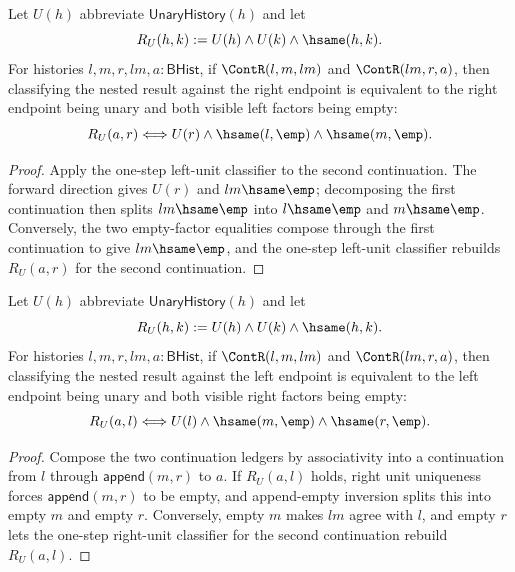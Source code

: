 \begin{theorem}
\label{thm:concrete-unary-history-magma-cont-nested-left-unit-classifier}
Let $U(h)$ abbreviate $\mathsf{UnaryHistory}(h)$ and let
$$
R_U(h,k):=U(h)\land U(k)\land\hsame(h,k).
$$
For histories $l,m,r,lm,a:\mathsf{BHist}$, if
$\ContR(l,m,lm)$ and $\ContR(lm,r,a)$, then classifying the nested result
against the right endpoint is equivalent to the right endpoint being unary and
both visible left factors being empty:
$$
R_U(a,r)
\Longleftrightarrow
U(r)\land\hsame(l,\emp)\land\hsame(m,\emp).
$$
\end{theorem}
\begin{proof}
Apply the one-step left-unit classifier to the second continuation. The
forward direction gives $U(r)$ and $lm\hsame\emp$; decomposing the first
continuation then splits $lm\hsame\emp$ into $l\hsame\emp$ and
$m\hsame\emp$. Conversely, the two empty-factor equalities compose through
the first continuation to give $lm\hsame\emp$, and the one-step left-unit
classifier rebuilds $R_U(a,r)$ for the second continuation.
\end{proof}

\begin{theorem}
\label{thm:concrete-unary-history-magma-cont-nested-right-unit-classifier}
Let $U(h)$ abbreviate $\mathsf{UnaryHistory}(h)$ and let
$$
R_U(h,k):=U(h)\land U(k)\land\hsame(h,k).
$$
For histories $l,m,r,lm,a:\mathsf{BHist}$, if
$\ContR(l,m,lm)$ and $\ContR(lm,r,a)$, then classifying the nested result
against the left endpoint is equivalent to the left endpoint being unary and
both visible right factors being empty:
$$
R_U(a,l)
\Longleftrightarrow
U(l)\land\hsame(m,\emp)\land\hsame(r,\emp).
$$
\end{theorem}
\begin{proof}
Compose the two continuation ledgers by associativity into a continuation from
\(l\) through \(\mathsf{append}(m,r)\) to \(a\). If \(R_U(a,l)\) holds, right
unit uniqueness forces \(\mathsf{append}(m,r)\) to be empty, and append-empty
inversion splits this into empty \(m\) and empty \(r\). Conversely, empty \(m\)
makes \(lm\) agree with \(l\), and empty \(r\) lets the one-step right-unit
classifier for the second continuation rebuild \(R_U(a,l)\).
\end{proof}

